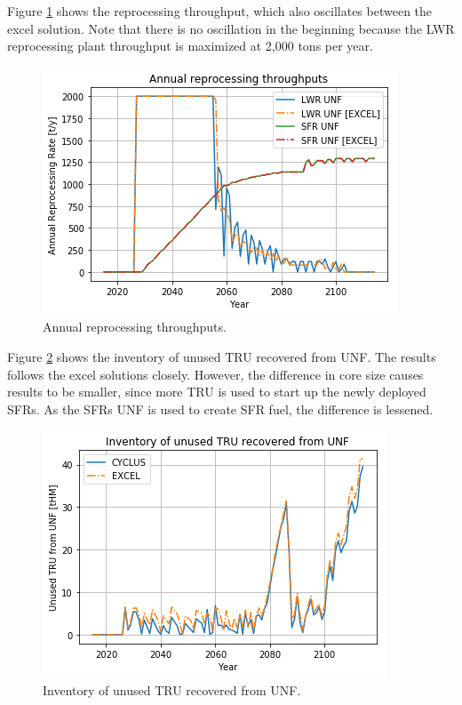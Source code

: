 Figure \ref{fig:rep} shows the reprocessing throughput, which also oscillates between
the excel solution. Note that there is no oscillation in the beginning because the
\gls{LWR} reprocessing plant throughput is maximized at 2,000 tons per year. 

\begin{figure}[htbp!]
    \begin{center}
        \includegraphics[scale=0.6]{./images/results_18/rep.png}
    \end{center}
        \caption{Annual reprocessing throughputs.}
    \label{fig:rep}
\end{figure}


Figure \ref{fig:tru} shows the inventory of unused \gls{TRU} recovered from \gls{UNF}.
The \Cyclus results follows the excel solutions closely. However, the difference
in core size causes \Cyclus results to be smaller, since more \gls{TRU} is used to
start up the newly deployed \glspl{SFR}. As the \glspl{SFR} \gls{UNF} is used to
create \gls{SFR} fuel, the difference is lessened.

\begin{figure}[htbp!]
	\begin{center}
		\includegraphics[scale=0.6]{./images/results_18/tru.png}
	\end{center}
        \caption{Inventory of unused \gls{TRU} recovered from \gls{UNF}.}
	\label{fig:tru}
\end{figure}

